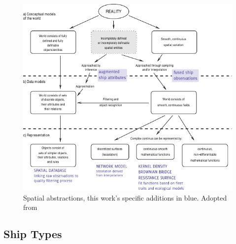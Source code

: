 \documentclass[12pt,letterpaper]{article}
\begin{document}
\begin{figure}[htbp]
  \centering
  \includegraphics[width=160mm]{figures/representation-in-gis.pdf}
  \caption{Spatial abstractions, this work's specific {\color{DBlue} additions in blue}. Adopted from \cite{Bivand2011}}
  \label{fig:representation-in-gis}
\end{figure}



\subsection{Ship Types}

\end{document}

